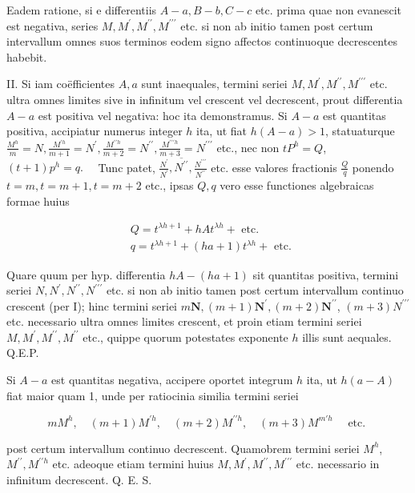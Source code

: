 \documentclass[10pt]{article}
\begin{document}
Eadem ratione, si e differentiis \(A-a, B-b, C-c\) etc. prima quae non evanescit est negativa, series \(M, M^{\prime}, M^{\prime \prime}, M^{\prime \prime \prime}\) etc. si non ab initio tamen post certum intervallum omnes suos terminos eodem signo affectos continuoque decrescentes habebit.

II. Si iam coëfficientes \(A, a\) sunt inaequales, termini seriei \(M, M^{\prime}, M^{\prime \prime}, M^{\prime \prime \prime}\) etc. ultra omnes limites sive in infinitum vel crescent vel decrescent, prout differentia \(A-a\) est positiva vel negativa: hoc ita demonstramus. Si \(A-a\) est quantitas positiva, accipiatur numerus integer \(h\) ita, ut fiat \(h(A-a)>1\), statuaturque \(\frac{M^{h}}{m}=N, \frac{M^{\prime h}}{m+1}=N^{\prime}, \frac{M^{\prime \prime h}}{m+2}=N^{\prime \prime}, \frac{M^{\prime \prime \prime h}}{m+3}=N^{\prime \prime \prime}\) etc., nec non \(t P^{h}=Q\), \((t+1) p^{h}=q . \quad\) Tunc patet, \(\frac{N^{\prime}}{N^{\prime}}, \overline{N^{\prime \prime}}, \frac{N^{\prime \prime \prime}}{N^{\prime \prime}}\) etc. esse valores fractionis \(\frac{Q}{q}\) ponendo \(t=m, t=m+1, t=m+2\) etc., ipsas \(Q, q\) vero esse functiones algebraicas formae huius

\[
\begin{aligned}
& Q=t^{\lambda h+1}+h A t^{\lambda h}+\text { etc. } \\
& q=t^{\lambda h+1}+(h a+1) t^{\lambda h}+\text { etc. }
\end{aligned}
\]

Quare quum per hyp. differentia \(h A-(h a+1)\) sit quantitas positiva, termini seriei \(N, N^{\prime}, N^{\prime \prime}, N^{\prime \prime \prime}\) etc. si non ab initio tamen post certum intervallum continuo crescent (per I); hinc termini seriei \(m \boldsymbol{N},(m+1) \boldsymbol{N}^{\prime},(m+2) \boldsymbol{N}^{\prime \prime}\), \((m+3) N^{\prime \prime \prime}\) etc. necessario ultra omnes limites crescent, et proin etiam termini seriei \(M, M^{\prime}, M^{\prime \prime}, M^{\prime \prime}\) etc., quippe quorum potestates exponente \(h\) illis sunt aequales. Q.E.P.

Si \(A-a\) est quantitas negativa, accipere oportet integrum \(h\) ita, ut \(h(a-A)\) fiat maior quam 1, unde per ratiocinia similia termini seriei

\[
m M^{h}, \quad(m+1) M^{\prime h}, \quad(m+2) M^{\prime \prime h}, \quad(m+3) M^{m \prime h} \quad \text { etc. }
\]

post certum intervallum continuo decrescent. Quamobrem termini seriei \(M^{h}\), \(M^{\prime \prime}, M^{\prime \prime h}\) etc. adeoque etiam termini huius \(M, M^{\prime}, M^{\prime \prime}, M^{\prime \prime \prime}\) etc. necessario in infinitum decrescent. Q. E. S.
\end{document}
